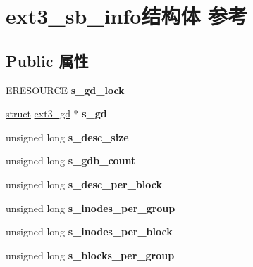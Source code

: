 \hypertarget{structext3__sb__info}{}\section{ext3\+\_\+sb\+\_\+info结构体 参考}
\label{structext3__sb__info}
\subsection*{Public 属性}
\begin{DoxyCompactItemize}
\item 
\mbox{\label{structext3__sb__info_a03970d463e1982e8b7aa5d9d4d4f0b9d}} 
E\+R\+E\+S\+O\+U\+R\+CE {\bfseries s\+\_\+gd\+\_\+lock}
\item 
\mbox{\label{structext3__sb__info_ac562d6d17b74f26eee6960bd0447a579}} 
\hyperlink{interfacestruct}{struct} \hyperlink{structext3__gd}{ext3\+\_\+gd} $\ast$ {\bfseries s\+\_\+gd}
\item 
\mbox{\label{structext3__sb__info_aa695b1e826369079a0fb989f37df4a40}} 
unsigned long {\bfseries s\+\_\+desc\+\_\+size}
\item 
\mbox{\label{structext3__sb__info_abfcd181413c1f0583995ed5bd3adbf78}} 
unsigned long {\bfseries s\+\_\+gdb\+\_\+count}
\item 
\mbox{\label{structext3__sb__info_aaf8e1ed207258ef1b18b18b3d90a7d39}} 
unsigned long {\bfseries s\+\_\+desc\+\_\+per\+\_\+block}
\item 
\mbox{\label{structext3__sb__info_abb530549ad016b525587d727b4a71d19}} 
unsigned long {\bfseries s\+\_\+inodes\+\_\+per\+\_\+group}
\item 
\mbox{\label{structext3__sb__info_ad44861b63a200130655d2dc75a538518}} 
unsigned long {\bfseries s\+\_\+inodes\+\_\+per\+\_\+block}
\item 
\mbox{\label{structext3__sb__info_ae0a79e2cd33aa7f8ee7698a10e2a5f48}} 
unsigned long {\bfseries s\+\_\+blocks\+\_\+per\+\_\+group}
\item 

\end{DoxyCompactItemize}
